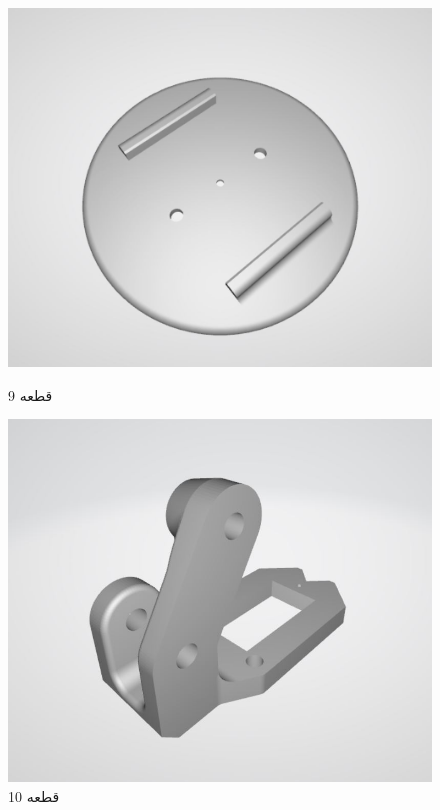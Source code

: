 \documentclass{article}
\begin{document}
\begin{figure}[H]
    \centering
    \begin{minipage}{0.5\linewidth}
        \centering
        \includegraphics[width=0.9\linewidth]{9.JPG}
        \caption{قطعه 9}
        \label{fig:label9}
    \end{minipage}%
    \begin{minipage}{0.5\linewidth}
        \centering
        \includegraphics[width=0.9\linewidth]{10.JPG}
        \caption{قطعه 10}
        \label{fig:label10}
    \end{minipage}
\end{figure}
\end{document}
